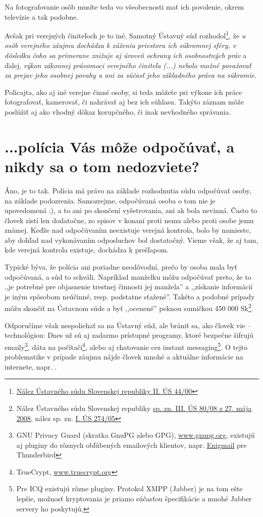 \documentclass[openany]{book}
\begin{document}
Na fotografovanie osôb musíte teda vo všeobecnosti mať ich povolenie, okrem televízie a tak podobne. 

Avšak pri verejných činiteľoch je to iné. Samotný Ústavný súd rozhodol\footnote{\href{http://www.concourt.sk/Zbierka/2001/10_01s.pdf}{Nález Ústavného súdu Slovenskej republiky II. ÚS 44/00}}, že \emph{u osôb verejného záujmu dochádza k zúženiu priestoru ich súkromnej sféry, v dôsledku čoho sa primerane znižuje aj úroveň ochrany ich osobnostných práv} a ďalej, \emph{výkon zákonnej právomoci verejného činiteľa (...) nebolo možné považovať za prejav jeho osobnej povahy a ani za súčasť jeho základného práva na súkromie}. 

Policajta, ako aj iné verejne činné osoby, si teda môžete pri výkone ich práce fotografovať, kamerovať, či nahrávať aj bez ich súhlasu. Takýto záznam môže poslúžiť aj ako vhodný dôkaz korupčného, či inak nevhodného správania. 

\section*{...polícia Vás môže odpočúvať, a nikdy sa o tom nedozviete?}

Áno, je to tak. Polícia má právo na základe rozhodnutia súdu odpočúvať osoby, na základe podozrenia. Samozrejme, odpočúvaná osoba o tom nie je upovedomená ;), a to ani po skončení vyšetrovania, ani ak bola nevinná. Často to človek zistí len dodatočne, zo spisov v konaní proti nemu alebo proti osobe jemu známej. Keďže nad odpočúvaním neexistuje verejná kontrola, bolo by namieste, aby dohľad nad vykonávaním odposluchov bol dostatočný. Vieme však, že aj tam, kde verejná kontrola existuje, dochádza k prešľapom.

Typické býva, že polícia ani poriadne neodôvodní, prečo by osoba mala byť odpočúvaná, a súd to schváli. Napríklad manželku môžu odpočúvať preto, že to ,,je potrebné pre objasnenie trestnej činnosti jej manžela'' a ,,získanie informácií je iným spôsobom neúčinné, resp. podstatne sťažené''. Takéto a podobné prípady môžu skončiť na Ústavnom súde a byť ,,ocenené'' peknou sumičkou 450 000 Sk\footnote{Nález Ústavného súdu Slovenskej republiky \href{http://www.concourt.sk/Zbierka/2008/08_30s.pdf}{sp. zn. III. ÚS 80/08 z 27. mája 2008}, nález sp. zn. \href{http://www.concourt.sk/Zbierka/2006/06_31s.pdf}{I. ÚS 274/05}}. 


Odporučíme však nespoliehať sa na Ústavný súd, ale brániť sa, ako človek vie -- technológiou: Dnes už sú aj zadarmo prístupné programy, ktoré bezpečne šifrujú emaily\footnote{GNU Privacy Guard (skratka GnuPG alebo GPG), \url{www.gnupg.org}, existujú aj pluginy do rôznych obľúbených emailových klientov, napr. \href{http://enigmail.mozdev.org}{Enigmail} pre Thunderbird }, dáta na počítači\footnote{TrueCrypt, \url{www.truecrypt.org}}, alebo aj chatovanie cez instant messaging\footnote{Pre ICQ existujú rôzne pluginy. Protokol XMPP (Jabber) je na tom ešte lepšie, možnosť kryptovania je priamo súčasťou špecifikácie a mnohé Jabber servery ho poskytujú. }. O tejto problematike v prípade záujmu nájde človek mnohé a aktuálne informácie na internete, napr. \cite{root}.
\end{document}
